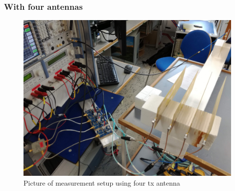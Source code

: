 \subsubsection{With four antennas}


\begin{figure}[H]
\centering 
\includegraphics[scale = 0.08]{figures/measurement/cree/four2one.jpg}
\caption{Picture of measurement setup using four tx antenna}
\label{fig:Meas_setup_cree1}
\end{figure} 


